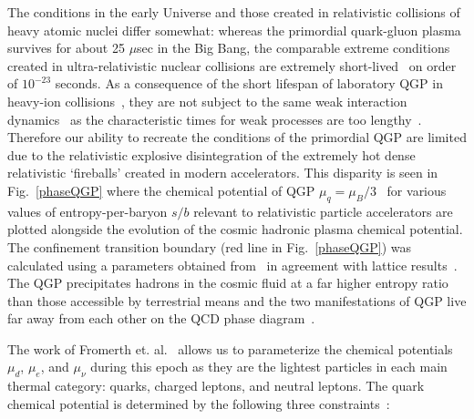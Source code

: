 \documentclass[universe,article,submit,moreauthors,pdftex,a4paper]{Definitions/mdpi}
\newcommand*{\rf}[1]{Fig.~{\ref{#1}}}
\begin{document}
The conditions in the early Universe and those created in relativistic collisions of heavy atomic nuclei differ somewhat: whereas the primordial quark-gluon plasma survives for about 25 $\mu$sec in the Big Bang, the comparable extreme conditions created in ultra-relativistic nuclear collisions are extremely short-lived~\cite{Rafelski:2001hp} on order of $10^{-23}$ seconds. As a consequence of the short lifespan of laboratory QGP in heavy-ion collisions~\cite{Ollitrault:1992bk,Petran:2013lja}, they are not subject to the same weak interaction dynamics~\cite{Ryu:2015vwa} as the characteristic times for weak processes are too lengthy~\cite{Rafelski:1982ii}. Therefore our ability to recreate the conditions of the primordial QGP are limited due to the relativistic explosive disintegration of the extremely hot dense relativistic `fireballs' created in modern accelerators. This disparity is seen in \rf{phaseQGP} where the chemical potential of QGP $\mu_{q}=\mu_{B}/3$~\cite{Rafelski:1987nv} for various values of entropy-per-baryon $s/b$ relevant to relativistic particle accelerators are plotted alongside the evolution of the cosmic hadronic plasma chemical potential. The confinement transition boundary (red line in \rf{phaseQGP}) was calculated using a parameters obtained from~\cite{Letessier:2002ony} in agreement with lattice results~\cite{HotQCD:2014kol}. The QGP precipitates hadrons in the cosmic fluid at a far higher entropy ratio than those accessible by terrestrial means and the two manifestations of QGP live far away from each other on the QCD phase diagram~\cite{Jacak:2012dx}.

The work of Fromerth et. al.~\cite{Fromerth:2012fe} allows us to parameterize the chemical potentials $\mu_d$, $\mu_e$, and $\mu_\nu$ during this epoch as they are the lightest particles in each main thermal category: quarks, charged leptons, and neutral leptons. The quark chemical potential is determined by the following three constraints~\cite{Fromerth:2012fe}:
\end{document}
